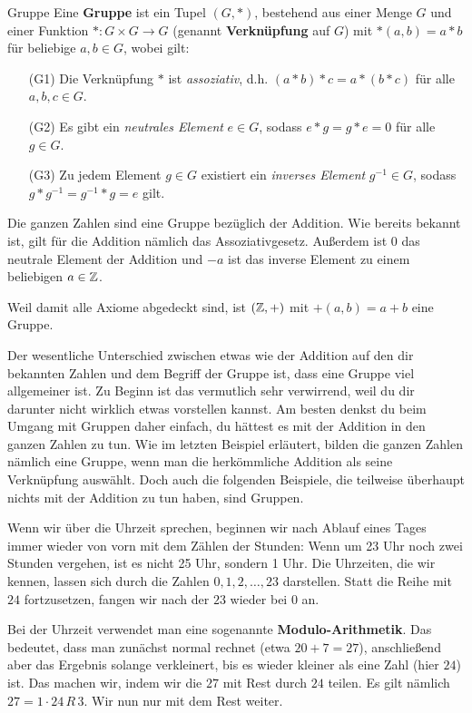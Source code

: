 \documentclass[../../main.tex]{subfiles}
\begin{document}
\begin{definition}{Gruppe}
    Eine \textbf{Gruppe} ist ein Tupel $(G,*)$, bestehend aus einer Menge $G$ und einer Funktion $*\colon G\times G\rightarrow G$ (genannt \textbf{Verknüpfung} auf $G$) mit $*(a,b)=a*b$ für beliebige $a,b \in G$, wobei gilt:
    \begin{enumerate}
        \item[(G1)] Die Verknüpfung $*$ ist \emph{assoziativ}, d.h. $(a*b)*c=a*(b*c)$ für alle $a,b,c\in G$.
        \item[(G2)] Es gibt ein \emph{neutrales Element} $e\in G$, sodass $e*g=g*e=0$ für alle $g\in G$.
        \item[(G3)] Zu jedem Element $g\in G$ existiert ein \emph{inverses Element} $g^{-1}\in G$, sodass $g*g^{-1}=g^{-1}*g=e$ gilt.
    \end{enumerate}
\end{definition}
\begin{advexample}{}
    Die ganzen Zahlen \Integer{} sind eine Gruppe bezüglich der Addition. Wie bereits bekannt ist, gilt für die Addition nämlich das Assoziativgesetz. Außerdem ist 0 das neutrale Element der Addition und $-a$ ist das inverse Element zu einem beliebigen $a\in\mathbb{Z}$.
    
    Weil damit alle Axiome abgedeckt sind, ist $(\mathbb{Z},+)$ mit $+(a,b)=a+b$ eine Gruppe.
\end{advexample}
Der wesentliche Unterschied zwischen etwas wie der Addition auf den dir bekannten Zahlen und dem Begriff der Gruppe ist, dass eine Gruppe viel allgemeiner ist. Zu Beginn ist das vermutlich sehr verwirrend, weil du dir darunter nicht wirklich etwas vorstellen kannst. Am besten denkst du beim Umgang mit Gruppen daher einfach, du hättest es mit der Addition in den ganzen Zahlen zu tun. Wie im letzten Beispiel erläutert, bilden die ganzen Zahlen nämlich eine Gruppe, wenn man die herkömmliche Addition als seine Verknüpfung auswählt. Doch auch die folgenden Beispiele, die teilweise überhaupt nichts mit der Addition zu tun haben, sind Gruppen.

\begin{advexample}{}
    Wenn wir über die Uhrzeit sprechen, beginnen wir nach Ablauf eines Tages immer wieder von vorn mit dem Zählen der Stunden: Wenn um 23 Uhr noch zwei Stunden vergehen, ist es nicht 25 Uhr, sondern 1 Uhr. Die Uhrzeiten, die wir kennen, lassen sich durch die Zahlen $0,1,2,\dots,23$ darstellen. Statt die Reihe mit $24$ fortzusetzen, fangen wir nach der $23$ wieder bei $0$ an.
    
    Bei der Uhrzeit verwendet man eine sogenannte \textbf{Modulo-Arithmetik}. Das bedeutet, dass man zunächst normal rechnet (etwa $20+7=27$), anschließend aber das Ergebnis solange verkleinert, bis es wieder kleiner als eine Zahl (hier $24$) ist. Das machen wir, indem wir die $27$ mit Rest durch $24$ teilen. Es gilt nämlich $27=1\cdot 24\,R\,3$. Wir nun nur mit dem Rest weiter.
\end{advexample}
\end{document}
